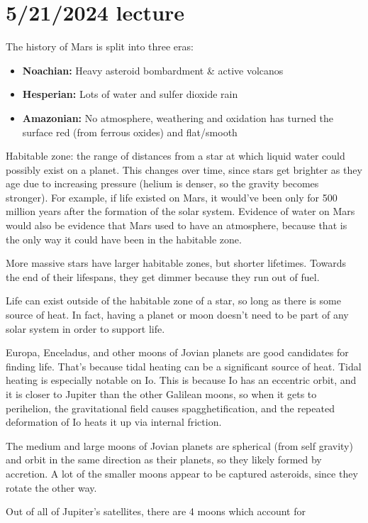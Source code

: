 \documentclass[class=article, crop=false]{standalone}
\begin{document}
\section{5/21/2024 lecture}
The history of Mars is split into three eras:
\begin{itemize}
    \item \textbf{Noachian:} Heavy asteroid bombardment \& active volcanos
    \item \textbf{Hesperian:} Lots of water and sulfer dioxide rain
    \item \textbf{Amazonian:} No atmosphere, weathering and oxidation has turned the surface red (from ferrous oxides) and flat/smooth
\end{itemize}
Habitable zone: the range of distances from a star at which liquid water could possibly exist on a planet. This changes over time, since stars get brighter as they age due to increasing pressure (helium is denser, so the gravity becomes stronger). For example, if life existed on Mars, it would've been only for 500 million years after the formation of the solar system. Evidence of water on Mars would also be evidence that Mars used to have an atmosphere, because that is the only way it could have been in the habitable zone.
\par
More massive stars have larger habitable zones, but shorter lifetimes. Towards the end of their lifespans, they get dimmer because they run out of fuel.
\par
Life can exist outside of the habitable zone of a star, so long as there is some source of heat. In fact, having a planet or moon doesn't need to be part of any solar system in order to support life.
\par
Europa, Enceladus, and other moons of Jovian planets are good candidates for finding life. That's because tidal heating can be a significant source of heat. Tidal heating is especially notable on Io. This is because Io has an eccentric orbit, and it is closer to Jupiter than the other Galilean moons, so when it gets to perihelion, the gravitational field causes spagghetification, and the repeated deformation of Io heats it up via internal friction.
\par
The medium and large moons of Jovian planets are spherical (from self gravity) and orbit in the same direction as their planets, so they likely formed by accretion. A lot of the smaller moons appear to be captured asteroids, since they rotate the other way.
\par
Out of all of Jupiter's satellites, there are 4 moons which account for 
\end{document}
